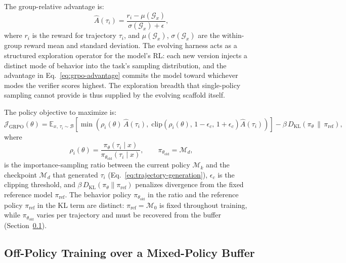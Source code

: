 The group-relative advantage is:
\begin{equation}
  \hat{A}(\tau_i) = \frac{r_i - \mu(\mathcal{G}_x)}{\sigma(\mathcal{G}_x) + \epsilon},
  \label{eq:grpo-advantage}
\end{equation}
where $r_i$ is the reward for trajectory $\tau_i$, and $\mu(\mathcal{G}_x)$, $\sigma(\mathcal{G}_x)$ are the within-group reward mean and standard deviation. The evolving harness acts as a structured exploration operator for the model's RL: each new version injects a distinct mode of behavior into the task's sampling distribution, and the advantage in Eq.~\ref{eq:grpo-advantage} commits the model toward whichever modes the verifier scores highest. The exploration breadth that single-policy sampling cannot provide is thus supplied by the evolving scaffold itself.

The policy objective to maximize is:
\begin{equation}
  \mathcal{J}_{\text{GRPO}}(\theta) = \mathbb{E}_{x,\, \tau_i \sim \mathcal{B}} \left[ \min\!\left( \rho_i(\theta)\,\hat{A}(\tau_i),\; \text{clip}\!\left(\rho_i(\theta),\, 1{-}\epsilon_c,\, 1{+}\epsilon_c\right)\hat{A}(\tau_i) \right) \right] - \beta\, D_{\text{KL}}\!\left(\pi_\theta \,\|\, \pi_{\text{ref}}\right),
  \label{eq:grpo-objective}
\end{equation}
where
\begin{equation}
  \rho_i(\theta) = \frac{\pi_\theta(\tau_i \mid x)}{\pi_{\theta_{\text{old}}}(\tau_i \mid x)}, \qquad \pi_{\theta_{\text{old}}} = \mathcal{M}_{d},
  \label{eq:grpo-ratio}
\end{equation}
is the importance-sampling ratio between the current policy $\mathcal{M}_{k}$ and the checkpoint $\mathcal{M}_{d}$ that generated $\tau_i$ (Eq.~\ref{eq:trajectory-generation}), $\epsilon_c$ is the clipping threshold, and $\beta\, D_{\text{KL}}(\pi_\theta \| \pi_{\text{ref}})$ penalizes divergence from the fixed reference model $\pi_{\text{ref}}$. The behavior policy $\pi_{\theta_{\text{old}}}$ in the ratio and the reference policy $\pi_{\text{ref}}$ in the KL term are distinct: $\pi_{\text{ref}} = \mathcal{M}_0$ is fixed throughout training, while $\pi_{\theta_{\text{old}}}$ varies per trajectory and must be recovered from the buffer (Section~\ref{sec:coevolution-offpolicy}).

\subsection{Off-Policy Training over a Mixed-Policy Buffer}
\label{sec:coevolution-offpolicy}

